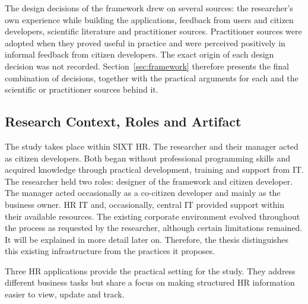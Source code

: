\documentclass[10pt,a4paper]{article}
\begin{document}
The design decisions of the framework drew on several sources: the
researcher's own experience while building the applications, feedback
from users and citizen developers, scientific literature and
practitioner sources. Practitioner sources were adopted when they
proved useful in practice and were perceived positively in informal
feedback from citizen developers. The exact origin of each design
decision was not recorded. Section~\ref{sec:framework} therefore
presents the final combination of decisions, together with the
practical arguments for each and the scientific or practitioner
sources behind it.


\subsection{Research Context, Roles and Artifact}
\label{sec:method-context}

The study takes place within SIXT HR. The researcher and their manager acted as citizen developers. Both began without professional programming skills and acquired knowledge through practical development, training and support from IT. The researcher held two roles: designer of the framework and citizen developer. The manager acted occasionally as a co-citizen developer and mainly as the business owner. HR IT and, occasionally, central IT provided support within their available resources. The existing corporate environment evolved throughout the process as requested by the researcher, although certain limitations remained. It will be explained in more detail later on. Therefore, the thesis distinguishes this existing infrastructure from the practices it proposes.

Three HR applications provide the practical setting for the study.
They address different business tasks but share a focus on making
structured HR information easier to view, update and track.
\end{document}
